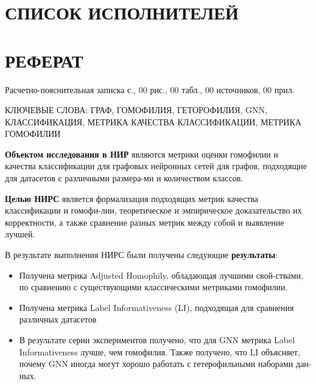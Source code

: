 \documentclass[a4paper,14pt]{article}
\begin{document}
    

    \section*{\hfill СПИСОК ИСПОЛНИТЕЛЕЙ \hfill}
    \newpage
    
    \section*{\hfill РЕФЕРАТ \hfill}
    
    Расчетно-пояснительная записка \pageref{LastPage} с., 00 рис., 00 табл., 00 источников, 00 прил.
    
    КЛЮЧЕВЫЕ СЛОВА: ГРАФ, ГОМОФИЛИЯ, ГЕТОРОФИЛИЯ, GNN, КЛАССИФИКАЦИЯ, МЕТРИКА КАЧЕСТВА КЛАССИФИКАЦИИ, МЕТРИКА ГОМОФИЛИИ 
    
    \textbf{Объектом исследования в  НИР} являются метрики оценки гомофилии и качества классификации для графовых нейронных сетей для графов, подходящие для датасетов с различными размера-ми и количеством классов.
    
    \textbf{Целью НИРС} является формализация подходящих метрик качества классификации и гомофи-лии, теоретическое и эмпирическое доказательство их корректности, а также сравнение разных метрик между собой и выявление лучшей. 
    
    
    В результате выполнения НИРС были получены следующие \textbf{результаты}:
    
    \begin{itemize}
    	\item Получена метрика Adjusted Homophily, обладающая лучшими свой-ствами, по сравнению с существующими классическими метриками гомофилии. 
    
    	\item Получена метрика Label Informativeness (LI), подходящая для сравнения различных датасетов 
    
    	\item В результате серии экспериментов получено, что  для  GNN метрика Label Informativeness лучше, чем гомофилия.
    	Также получено, что LI объясняет, почему GNN иногда могут хорошо работать с гетерофильными наборами дан-ных.
\end{itemize}

  
    \newpage
    
    \tableofcontents
    \pagebreak
    
\end{document}
